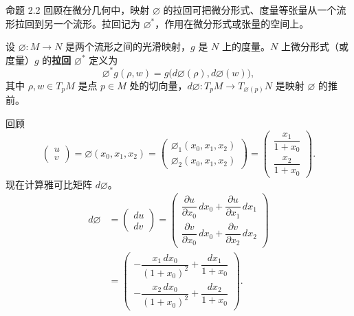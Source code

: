\begin{statement}{命题 2.2}{}
回顾在微分几何中，映射 $\varnothing$ 的拉回可把微分形式、度量等张量从一个流形拉回到另一个流形。拉回记为 $\varnothing^*$，作用在微分形式或张量的空间上。

设 $\varnothing\colon M\to N$ 是两个流形之间的光滑映射，$g$ 是 $N$ 上的度量。$N$ 上微分形式（或度量）$g$ 的\textbf{拉回} $\varnothing^*$ 定义为
\begin{equation*}
  \varnothing^*g(\rho,w)=g\bigl(d\varnothing(\rho),d\varnothing(w)\bigr),
  \tag{2.56}\label{eq:2.56}
\end{equation*}
其中 $\rho,w\in T_pM$ 是点 $p\in M$ 处的切向量，$d\varnothing\colon T_pM\to T_{\varnothing(p)}N$ 是映射 $\varnothing$ 的推前。

回顾
\[
  \begin{pmatrix}u\\v\end{pmatrix}
  =\varnothing(x_0,x_1,x_2)
  =\begin{pmatrix}\varnothing_1(x_0,x_1,x_2)\\
                   \varnothing_2(x_0,x_1,x_2)\end{pmatrix}
  =\begin{pmatrix}\dfrac{x_1}{1+x_0}\\[5pt]\dfrac{x_2}{1+x_0}\end{pmatrix}.
\]
现在计算雅可比矩阵 $d\varnothing$。
\begin{equation*}
  \begin{aligned}
    d\varnothing
      &=\begin{pmatrix}du\\dv\end{pmatrix}
      =\begin{pmatrix}
        \dfrac{\partial u}{\partial x_0}\,dx_0+\dfrac{\partial u}{\partial x_1}\,dx_1\\[5pt]
        \dfrac{\partial v}{\partial x_0}\,dx_0+\dfrac{\partial v}{\partial x_2}\,dx_2
       \end{pmatrix}\\[4pt]
      &=\begin{pmatrix}
        -\dfrac{x_1\,dx_0}{(1+x_0)^2}+\dfrac{dx_1}{1+x_0}\\[5pt]
        -\dfrac{x_2\,dx_0}{(1+x_0)^2}+\dfrac{dx_2}{1+x_0}
       \end{pmatrix}.
  \end{aligned}
  \tag{2.57}\label{eq:2.57}
\end{equation*}


\end{statement}
